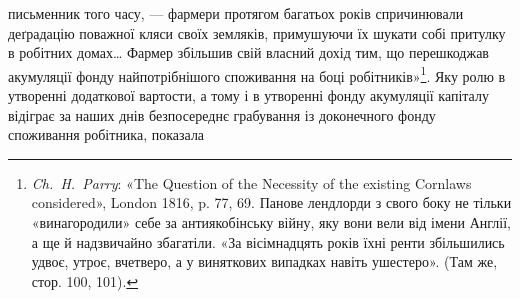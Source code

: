 письменник того часу, — фармери протягом багатьох років
спричинювали деґрадацію поважної кляси своїх земляків, примушуючи
їх шукати собі притулку в робітних домах\dots{} Фармер
збільшив свій власний дохід тим, що перешкоджав акумуляції
фонду найпотрібнішого споживання на боці робітників»\footnote{
\emph{Ch.~H.~Parry}: «The Question of the Necessity of the existing Cornlaws
considered», London 1816, p. 77, 69. Панове лендлорди з свого боку
не тільки «винагородили» себе за антиякобінську війну, яку вони вели
від імени Англії, а ще й надзвичайно збагатіли. «За вісімнадцять років
їхні ренти збільшились удвоє, утроє, вчетверо, а у виняткових випадках
навіть ушестеро». (Там же, стор. 100, 101).
}. Яку
ролю в утворенні додаткової вартости, а тому і в утворенні
фонду акумуляції капіталу відіграє за наших днів безпосереднє
грабування із доконечного фонду споживання робітника, показала
\parbreak{}  %
